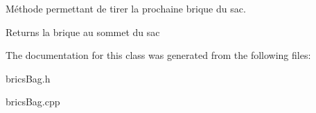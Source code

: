 Méthode permettant de tirer la prochaine brique du sac. 

\begin{DoxyReturn}{Returns}
la brique au sommet du sac 
\end{DoxyReturn}


The documentation for this class was generated from the following files\+:\begin{DoxyCompactItemize}
\item 
brics\+Bag.\+h\item 
brics\+Bag.\+cpp\end{DoxyCompactItemize}

